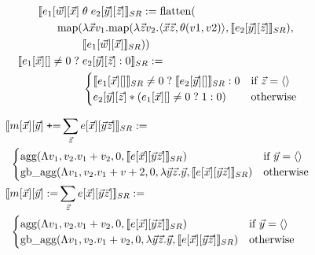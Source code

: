 \noindent{}


\begin{align*}
\llbracket e_1[\vec{w}][\vec{x}] \; & \theta \; e_2[\vec{y}][\vec{z}] \rrbracket_{SR} :=
  \mbox{flatten}(
\\
  \mbox{map}( & \lambda \vec{x}v_1.
  \mbox{map}(\lambda \vec{z}v_2. {\langle\vec{x}\vec{z},\theta(v1,v2)\rangle},
         \llbracket e_2[\vec{y}][\vec{z}] \rrbracket_{SR}),
\\
& \llbracket e_1[\vec{w}][\vec{x}] \rrbracket_{SR}))
\\
\llbracket e_1[\vec{x}][] \neq 0 \; ? \; & e_2[\vec{y}][\vec{z}] : 0 \rrbracket_{SR} :=
\\
&
\begin{cases}
\llbracket e_1[\vec{x}][] \rrbracket_{SR} \neq 0 \; ? \; \llbracket e_2[\vec{y}][] \rrbracket_{SR} : 0
& \mbox{if $\vec{z} = {\langle\rangle}$}
\\
e_2[\vec{y}][\vec{z}] * (e_1[\vec{x}][] \neq 0 \; ? \; 1 : 0)
& \mbox{otherwise}
\end{cases}
\end{align*}

\noindent{}

\noindent{}
\begin{align*}
\llbracket  & m[\vec{x}][\vec{y}] \; \mbox{{\tt +}=} \sum_{\vec{z}}
    e[\vec{x}][\vec{y}\vec{z}] \rrbracket_{SR} :=
\\
& \begin{cases}
  \mbox{agg}(\Lambda v_1,v_2. v_1+v_2 , 0,
         \llbracket e[\vec{x}][\vec{y}\vec{z}] \rrbracket_{SR})
  & \mbox{if $\vec{y} = {\langle\rangle}$}
  \\
  \mbox{gb\_agg}(\Lambda v_1,v_2. v_1+v+2 , 0, \lambda \vec{y}\vec{z}.\vec{y},
        \llbracket e[\vec{x}][\vec{y}\vec{z}] \rrbracket_{SR})
  & \mbox{otherwise}
  \end{cases}
\\
\llbracket  & m[\vec{x}][\vec{y}] \; \mbox{:=} \sum_{\vec{z}}
    e[\vec{x}][\vec{y}\vec{z}] \rrbracket_{SR} :=
\\
& \begin{cases}
  \mbox{agg}(\Lambda v_1,v_2. v_1+v_2 , 0, \llbracket e[\vec{x}][\vec{y}\vec{z}] \rrbracket_{SR})
  & \mbox{if $\vec{y} = {\langle\rangle}$}
  \\
  \mbox{gb\_agg}(\Lambda v_1,v_2. v_1+v_2 , 0, \lambda \vec{y}\vec{z}.\vec{y},
        \llbracket e[\vec{x}][\vec{y}\vec{z}] \rrbracket_{SR})
  & \mbox{otherwise}
  \end{cases}
\\
\end{align*}

